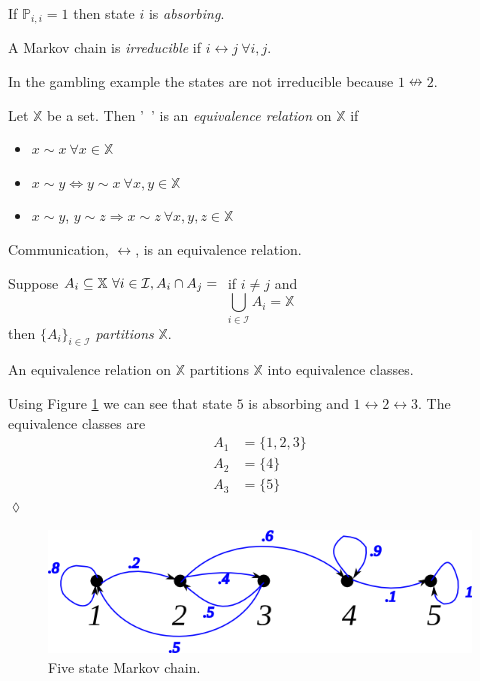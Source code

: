 \documentclass[lecture,12pt,]{pcms-l}
\begin{document}
\begin{definition}
If $\mathbb{P}_{i,i}=1$ then state $i$ is \textit{absorbing}.
\end{definition}

\begin{definition}
A Markov chain is \textit{irreducible} if $i\leftrightarrow j ~\forall i,j$.
\end{definition}
In the gambling example the states are not irreducible because $1\nleftrightarrow 2$.

\begin{definition}
Let $\mathbb{X}$ be a set. Then '~' is an \textit{equivalence relation} on $\mathbb{X}$ if
\begin{itemize}
\item $x\sim x ~\forall x\in\mathbb{X}$
\item $x\sim y \Leftrightarrow y\sim x ~\forall x,y\in\mathbb{X}$
\item $x\sim y$, $y\sim z \Rightarrow x\sim z ~\forall x,y,z\in\mathbb{X}$
\end{itemize}
\end{definition}

\begin{theorem}
Communication, $\leftrightarrow$, is an equivalence relation.
\end{theorem}

\begin{definition}
Suppose $A_i\subseteq \mathbb{X} ~\forall i\in\mathcal{I}, A_i\cap A_j=\null$ if $i\neq j$ and
$$\bigcup_{i\in\mathcal{I}}A_i = \mathbb{X}$$
then $\{A_i\}_{i\in\mathcal{I}}$ \textit{partitions} $\mathbb{X}$.
\end{definition}

\begin{theorem}
An equivalence relation on $\mathbb{X}$ partitions $\mathbb{X}$ into equivalence classes.
\end{theorem}

\begin{example}
Using Figure \ref{fig:09mc5} we can see that state $5$ is absorbing and $1\leftrightarrow 2\leftrightarrow 3$. The equivalence classes are
\begin{align*}
A_1 &= \{1,2,3\} \\
A_2 &= \{4\} \\
A_3 &= \{5\}
\end{align*}
$\lozenge$
\end{example}

\begin{figure}[ht!]
	\centering
	\includegraphics[width=.4\textwidth]{images/09mc5}
	\caption{Five state Markov chain.}
	\label{fig:09mc5}
\end{figure}
\end{document}
